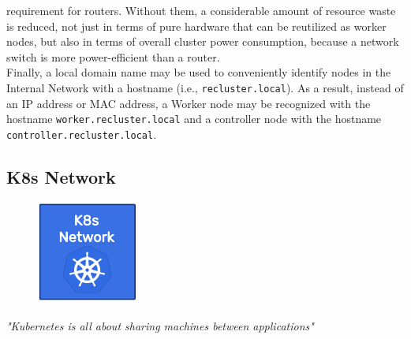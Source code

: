 requirement for routers. Without them, a considerable amount of resource waste
is reduced, not just in terms of pure hardware that can be reutilized as worker nodes,
but also in terms of overall cluster power consumption, because a network switch
is more power-efficient than a router\cite{switch_vs_router_power_consumption}. \\ %
Finally, a local domain name may be used to conveniently identify nodes in the Internal
Network with a hostname (i.e., \texttt{recluster.local})\cite{rfc_2606}. As a
result, instead of an IP address or MAC address, a Worker node may be recognized
with the hostname \texttt{worker.recluster.local} and a controller node with the
hostname \texttt{controller.recluster.local}.

\subsection{K8s Network}
\label{subsec:architecture_network_k8s_network}

\begin{figure}
  \centering
  \includegraphics[width=\linewidth]{images/architecture/k8s_network.pdf}
\end{figure}

\textit{"Kubernetes is all about sharing machines between applications"}\cite{k8s}
\\ %

